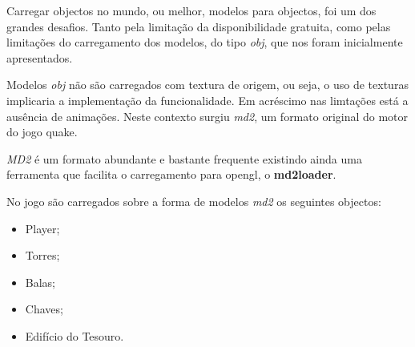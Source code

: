 


Carregar objectos no mundo, ou melhor, modelos para objectos, foi um dos grandes desafios. Tanto pela limitação da disponibilidade gratuita, como pelas limitações do carregamento dos modelos, do tipo \textit{obj}, que nos foram inicialmente apresentados.

Modelos \textit{obj} não são carregados com textura de origem, ou seja, o uso de texturas implicaria a implementação da funcionalidade. Em acréscimo nas limtações está a ausência de animações.
Neste contexto surgiu \textit{md2}, um formato original do motor do jogo quake.

\textit{MD2} é um formato abundante e bastante frequente existindo ainda uma ferramenta que facilita o carregamento para opengl, o {\bf md2loader}.

No jogo são carregados sobre a forma de modelos \textit{md2} os seguintes objectos:
\begin{itemize}
\item Player;
\item Torres;
\item Balas;
\item Chaves;
\item Edifício do Tesouro.
\end{itemize}

